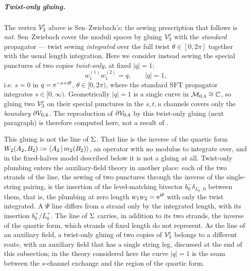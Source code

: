 \subparagraph{Twist-only gluing.} The vertex ${\mathcal{V}}_3'$ above is
Sen--Zwiebach's; the sewing prescription that follows is \emph{not}. Sen--Zwiebach cover the
moduli spaces by gluing ${\mathcal{V}}_3'$ with the \emph{standard} propagator --- twist sewing
\emph{integrated} over the full twist $\theta\in[0,2\pi]$ together with the usual length
integration. Here we consider instead sewing the special punctures of two copies \emph{twist-only}, at fixed $|q|=1$:
\begin{equation}
	w_1^{(1)}w_1^{(2)}=q,\qquad |q|=1,
	\label{ov:eq:twistonly}
\end{equation}
i.e. $s=0$ in $q=\mathrm{e}^{-s+\mathrm{i}\theta}$, $\theta\in[0,2\pi)$, where the standard SFT propagator integrates
$s\in[0,\infty)$. Geometrically $|q|=1$ is a single curve in ${\mathcal{M}}_{0,4}\cong\mathbb{C}$, so
gluing two ${\mathcal{V}}_3'$ on their special punctures in the $s,t,u$ channels covers only the
\emph{boundary} $\partial{\mathcal{V}}_{0,4}$. The reproduction of $\partial{\mathcal{V}}_{0,4}$ by this
twist-only gluing (next paragraph) is therefore computed here, not a result of
\cite{SenZwiebach1994}.

This gluing is not the line of $\Sigma$.
That line is the inverse of the quartic form $W_2(A_2,B_2):=\left \langle A_2\,|\,m_2(B_2) \right \rangle$, an operator with no modulus to integrate over, and in the fixed-halves model described below it is not a gluing at all.
Twist-only plumbing enters the auxiliary-field theory in another place: each of the two strands of the line, the sewing of two punctures through the inverse of the single-string pairing, is the insertion of the level-matching bivector $b_0^-\delta_{L_0^-,0}$ between them, that is, the plumbing at zero length $w_1w_2=\mathrm{e}^{\mathrm{i}\theta}$ with only the twist integrated.
A $\Psi$ line differs from a strand only by the integrated length, with its insertion $b_0^+/L_0^+$.
The line of $\Sigma$ carries, in addition to its two strands, the inverse of the quartic form, which strands of fixed length do not represent.
As the line of an auxiliary field, a twist-only gluing of two copies of ${\mathcal{V}}_3'$ belongs to a different route, with an auxiliary field that has a single string leg, discussed at the end of this subsection; in the theory considered here the curve $|q|=1$ is the seam between the $s$-channel exchange and the region of the quartic form.


